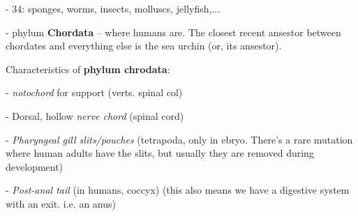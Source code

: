\documentclass{article}
\theoremstyle{definition}
\begin{document}
\indent\indent - 34: sponges, worms, insects, molluscs, jellyfish,...

\indent\indent - phylum \textbf{Chordata} -- where humans are. The closest recent ansestor between chordates and everything else is the sea urchin (or, its ansestor).

Characteristics of \textbf{phylum chrodata}:

\indent\indent - \textit{notochord} for support (verts. spinal col)

\indent\indent - Dorsal, hollow \textit{nerve chord} (spinal cord)

\indent\indent - \textit{Pharyngeal gill slits/pouches} (tetrapoda, only in ebryo. There's a rare mutation where human adults have the slits, but usually they are removed during development) 

\indent\indent - \textit{Post-anal tail}  (in humans, coccyx) (this also means we have a digestive system with an exit. i.e. an anus)
\end{document}
